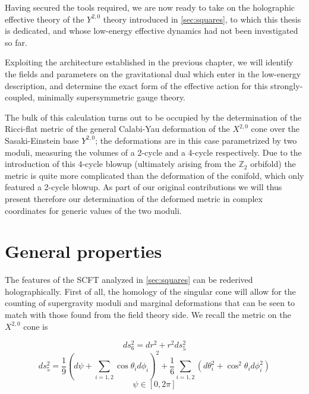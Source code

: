 %
%
%
\graphicspath{{images/}}
%

\label{chap:y20}

%

Having secured the tools required, we are now ready to take on the holographic effective theory of the $Y^{2,0}$ theory introduced in \ref{sec:squares}, to which this thesis is dedicated, and whose low-energy effective dynamics had not been investigated so far.

Exploiting the architecture established in the previous chapter, we will identify the fields and parameters on the gravitational dual which enter in the low-energy description, and determine the exact form of the effective action for this strongly-coupled, minimally supersymmetric gauge theory. 

The bulk of this calculation turns out to be occupied by the determination of the Ricci-flat metric of the general Calabi-Yau deformation of the $X^{2,0}$ cone over the Sasaki-Einstein base $Y^{2,0}$; the deformations are in this case parametrized by two moduli, measuring the volumes of a 2-cycle and a 4-cycle respectively. Due to the introduction of this 4-cycle blowup (ultimately arising from the $\mathbb{Z}_2$ orbifold) the metric is quite more complicated than the deformation of the conifold, which only featured a 2-cycle blowup. As part of our original contributions we will thus present therefore our determination of the deformed metric in complex coordinates for generic values of the two moduli.

\section{General properties}

The features of the SCFT analyzed in \ref{sec:squares} can be rederived holographically. First of all, the homology of the singular cone will allow for the counting of supergravity moduli and marginal deformations that can be seen to match with those found from the field theory side. We recall the metric on the $X^{2,0}$ cone is

\begin{equation}
	ds_6^2 = dr^2 + r^2 ds_5^2
	\label{}
\end{equation}
\begin{equation}
	ds_5^2 = \frac{1}{9}\left( d\psi + \sum_{i=1,2} \cos\theta_i d\phi_i\right)^2 + 
	\frac{1}{6} \sum_{i=1,2} \left(d\theta_i^2 + \cos^2\theta_i d\phi_i^2 \right)
\end{equation}
\begin{equation}
	\psi \in [0,2\pi]
	\label{}
\end{equation}

